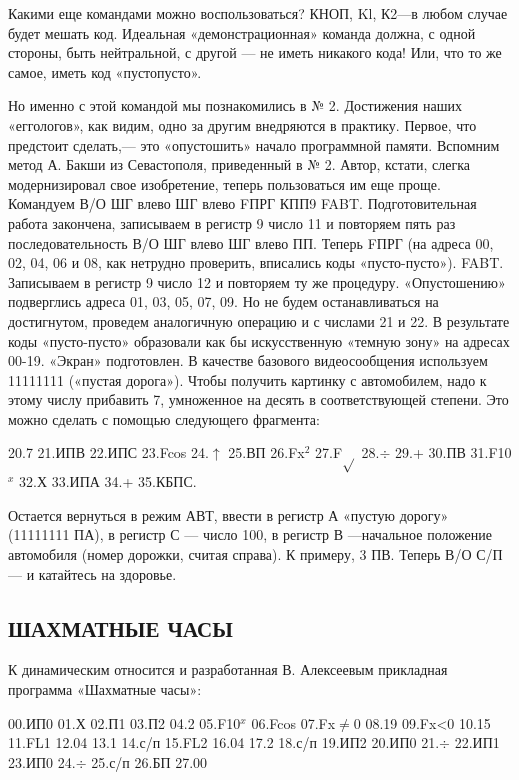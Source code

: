 \documentclass[11pt,a4paper,oneside]{article}
\begin{document}
Какими еще командами можно воспользоваться? КНОП, Kl, К2—в любом случае будет мешать код. Идеальная «демонстрационная» команда должна, с одной стороны, быть нейтральной, с другой — не иметь никакого кода! Или, что то же самое, иметь код «пустопусто».

Но именно с этой командой мы познакомились в № 2. Достижения наших «еггологов», как видим, одно за другим внедряются в практику. Первое, что предстоит сделать,— это «опустошить» начало программной памяти. Вспомним метод А. Бакши из Севастополя, приведенный в № 2. Автор, кстати, слегка модернизировал свое изобретение, теперь пользоваться им еще проще. Командуем В/О ШГ влево ШГ влево FПРГ КПП9 FABT. Подготовительная работа закончена, записываем в регистр 9 число 11 и повторяем пять раз последовательность В/О ШГ влево ШГ влево ПП. Теперь FПРГ (на адреса 00, 02, 04, 06 и 08, как нетрудно проверить, вписались коды «пусто-пусто»). FABT. Записываем в регистр 9 число 12 и повторяем ту же процедуру. «Опустошению» подверглись адреса 01, 03, 05, 07, 09. Но не будем останавливаться на достигнутом, проведем аналогичную операцию и с числами 21 и 22. В результате коды «пусто-пусто» образовали как бы искусственную «темную зону» на адресах 00-19. «Экран» подготовлен.
В качестве базового видеосообщения используем 11111111 («пустая дорога»). Чтобы получить картинку с автомобилем, надо к этому числу прибавить 7, умноженное на десять в соответствующей степени. Это можно сделать с помощью следующего фрагмента:

20.7 21.ИПВ 22.ИПС 23.Fcos 24.$\uparrow$ 25.ВП 26.Fx$^{2}$ 27.F$\sqrt{}$ 28.$\div$ 29.+ 30.ПВ 31.F10$^{x}$ 32.Х 33.ИПА 34.+ 35.КБПС.

Остается вернуться в режим АВТ, ввести в регистр А «пустую дорогу» (11111111 ПА), в регистр С — число 100, в регистр В —начальное положение автомобиля (номер дорожки, считая справа). К примеру, 3 ПВ. Теперь В/О С/П — и катайтесь на здоровье.

\subsection{ШАХМАТНЫЕ ЧАСЫ}
К динамическим относится и разработанная В. Алексеевым прикладная программа «Шахматные часы»:

00.ИП0 01.Х 02.П1 03.П2 04.2 05.F10$^{x}$ 06.Fcos
07.Fx$\neq$0 08.19 09.Fx<0 10.15 11.FL1 12.04 13.1 14.с/п 15.FL2 16.04 17.2 18.с/п 19.ИП2 20.ИП0 21.$\div$ 22.ИП1 23.ИП0 24.$\div$ 25.с/п 26.БП 27.00
\end{document}
